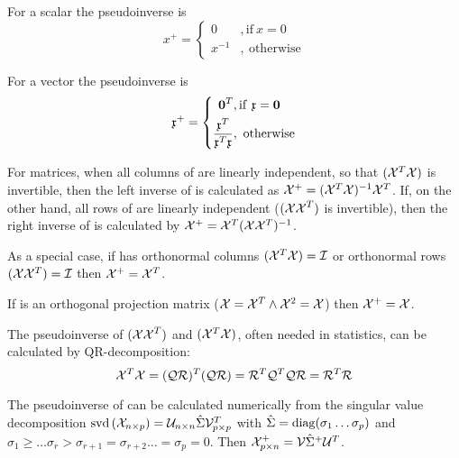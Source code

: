 For a scalar  the pseudoinverse is
\begin{equation}
   x^+ = \left\lbrace \begin{aligned}
                  0&, \mathrm{if}\ x=0\\
                  x^{-1}&,\ \mathrm{otherwise}
                \end{aligned}
         \right.
\end{equation}

For a vector  the pseudoinverse is
\begin{equation}
   \AbsVec{x}^+ = \left\lbrace \begin{aligned}
                                  \mathbf{0}^T&, \mathrm{if}\ \AbsVec{x}=\mathbf{0}\\
                                  \frac{\AbsVec{x}^T}{\AbsVec{x}^T \AbsVec{x}}&,\ \mathrm{otherwise}
                               \end{aligned}
                  \right.
\end{equation}

For matrices, when all columns of  are linearly independent, so that \((\mathcal{X}^T\mathcal{X}) \) is invertible, then the left inverse of  is calculated as \(\mathcal{X}^+ = (\mathcal{X}^T \mathcal{X})^{-1} \mathcal{X}^T \). If, on the other hand, all rows of  are linearly independent (\( (\mathcal{XX}^T) \) is invertible), then the right inverse of  is calculated by \(\mathcal{X}^+ = \mathcal{X}^T (\mathcal{X}\mathcal{X}^T)^{-1} \).

As a special case, if  has orthonormal columns \((\mathcal{X}^T\mathcal{X}) = \mathcal{I} \) or orthonormal rows \((\mathcal{X}\mathcal{X}^T) = \mathcal{I} \) then \(\mathcal{X}^+ = \mathcal{X}^T \).

If  is an orthogonal projection matrix (\( \mathcal{X} = \mathcal{X}^T \wedge \mathcal{X}^2 = \mathcal{X} \)) then \(\mathcal{X}^+ = \mathcal{X} \).

The pseudoinverse of \((\mathcal{XX}^T) \) and \((\mathcal{X}^T\mathcal{X}) \), often needed in statistics, can be calculated by QR-decomposition:
\begin{equation}
    \mathcal{X}^T \mathcal{X} = (\mathcal{QR})^T (\mathcal{QR}) = \mathcal{R}^T \mathcal{Q}^T \mathcal{QR} = \mathcal{R}^T \mathcal{R}
\end{equation}

The pseudoinverse of  can be calculated numerically from the singular value decomposition \(\operatorname{svd}{(\mathcal{X}_{n\times p})} = \mathcal{U}_{n\times n} \hat{\Sigma} \mathcal{V}^T_{p\times p} \) with \( \hat{\Sigma} = \operatorname{diag}(\sigma_1 \ldots \sigma_p) \) and \(\sigma_1 \geq \ldots \sigma_r > \sigma_{r+1} = \sigma_{r+2} \ldots = \sigma_p = 0 \). Then  \( \mathcal{X}^+_{p\times n} = \mathcal{V} \hat{\Sigma}^+ \mathcal{U}^T \).

